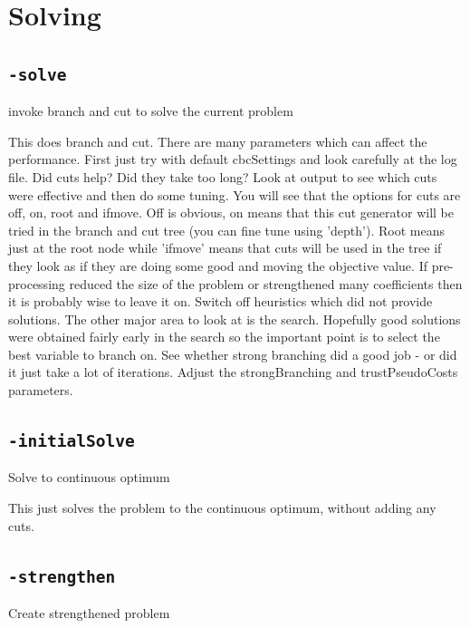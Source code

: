 \documentclass[11pt,a4paper]{article}
\begin{document}
\section{Solving}

\subsection*{\texttt{-solve}}

invoke branch and cut to solve the current problem

This does branch and cut. There are many parameters which can affect the performance.  First just try with default cbcSettings and look carefully at the log file.  Did cuts help?  Did they take too long?  Look at output to see which cuts were effective and then do some tuning.  You will see that the options for cuts are off, on, root and ifmove.  Off is obvious, on means that this cut generator will be tried in the branch and cut tree (you can fine tune using 'depth').  Root means just at the root node while 'ifmove' means that cuts will be used in the tree if they look as if they are doing some good and moving the objective value.  If pre-processing reduced the size of the problem or strengthened many coefficients then it is probably wise to leave it on.  Switch off heuristics which did not provide solutions.  The other major area to look at is the search.  Hopefully good solutions were obtained fairly early in the search so the important point is to select the best variable to branch on.  See whether strong branching did a good job - or did it just take a lot of iterations.  Adjust the strongBranching and trustPseudoCosts parameters.

\subsection*{\texttt{-initialSolve}}

Solve to continuous optimum

This just solves the problem to the continuous optimum, without adding any cuts.

\subsection*{\texttt{-strengthen}}

Create strengthened problem
\end{document}
